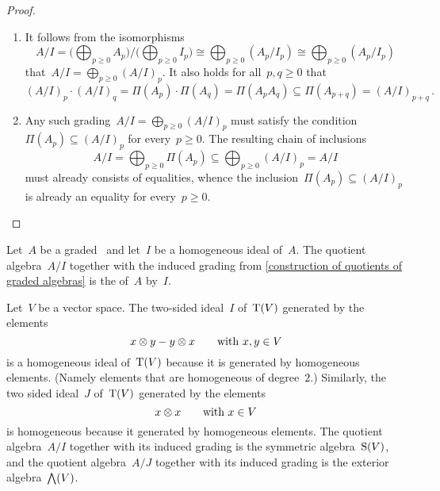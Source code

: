 \begin{proof}
	\leavevmode
	\begin{enumerate}
		\item
			It follows from the isomorphisms
			\[
				A/I
				=
				\Biggl( \bigoplus_{p \geq 0} A_p \Biggr)
				\bigg/
				\Biggl( \bigoplus_{p \geq 0} I_p \Biggr)
				\cong
				\bigoplus_{p \geq 0} {} (A_p / I_p)
				\cong
				\bigoplus_{p \geq 0} {} (A_p / I_p)
			\]
			that~$A/I = \bigoplus_{p \geq 0} {} (A/I)_p$.
			It also holds for all~$p, q \geq 0$ that
			\[
				(A/I)_p \cdot (A/I)_q
				=
				\Pi(A_p) \cdot \Pi(A_q)
				=
				\Pi(A_p A_q)
				\subseteq
				\Pi( A_{p+q} )
				=
				(A/I)_{p+q} \,.
			\]
		\item
			Any such grading~$A/I = \bigoplus_{p \geq 0} {} (A/I)_p$ must satisfy the condition~$\Pi(A_p) \subseteq (A/I)_p$ for every~$p \geq 0$.
			The resulting chain of inclusions
			\[
				A/I
				=
				\bigoplus_{p \geq 0} \Pi(A_p)
				\subseteq
				\bigoplus_{p \geq 0} {} (A/I)_p
				=
				A/I
			\]
			must already consists of equalities, whence the inclusion~$\Pi(A_p) \subseteq (A/I)_p$ is already an equality for every~$p \geq 0$.
		\qedhere
	\end{enumerate}
\end{proof}


\begin{definition}
	Let~$A$ be a graded~\algebra{$\kf$} and let~$I$ be a homogeneous ideal of~$A$.
	The quotient algebra~$A/I$ together with the induced grading from \cref{construction of quotients of graded algebras} is the  of~$A$ by~$I$.
\end{definition}


\begin{examples}
	Let~$V$ be a vector space.
	The two-sided ideal~$I$ of~$\operatorname{T}(V)$ generated by the elements
	\[
		x \otimes y - y \otimes x
		\qquad
		\text{with~$x, y \in V$}
	\]
	is a homogeneous ideal of~$\operatorname{T}(V)$ because it is generated by homogeneous elements.
	(Namely elements that are homogeneous of degree~$2$.)
	Similarly, the two sided ideal~$J$ of~$\operatorname{T}(V)$ generated by the elements
	\[
		x \otimes x
		\qquad
		\text{with~$x \in V$}
	\]
	is homogeneous because it generated by homogeneous elements.
	The quotient algebra~$A/I$ together with its induced grading is the symmetric algebra~$\operatorname{S}(V)$, and the quotient algebra~$A/J$ together with its induced grading is the exterior algebra~$\operatorname{\bigwedge}(V)$.
\end{examples}


